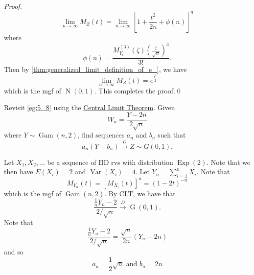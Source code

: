 \documentclass[notoc,notitlepage]{tufte-book}
\DeclareMathOperator{\Exp}{Exp }
\DeclareMathOperator{\Nor}{N }
\DeclareMathOperator{\Gau}{G }
\DeclareMathOperator{\Gam}{Gam }
\DeclareMathOperator{\Var}{Var }
\newcommand{\convd}{\overset{D}{\to}}
\begin{document}
\begin{proof}
  \begin{equation*}
    \lim_{n \to \infty} M_Z (t) = \lim_{n \to \infty} \left[ 1 + \frac{t^2}{2n} + \phi(n) \right]^n
  \end{equation*}
  where 
  \begin{equation*}
    \phi(n) = \frac{M_{Y_i}^{(3)} ( \zeta ) \left( \frac{t}{\sqrt{n}} \right)^3}{3!}.
  \end{equation*}
  Then by \cref{thm:generalized_limit_definition_of_e_}, we have
  \begin{equation*}
    \lim_{n \to \infty} M_Z(t) = e^{\frac{t^2}{2}}
  \end{equation*}
  which is the mgf of $\Nor(0, 1)$. This completes the proof.\qed
\end{proof}

\begin{eg}[Example 5.9]
  Revisit \cref{eg:5_8} using the \hyperref[thm:central_limit_theorem]{\faCoffee \; Central Limit Theorem}. Given
  \begin{equation*}
    W_n = \frac{Y - 2n}{2 \sqrt{n}}
  \end{equation*}
  where $Y \sim \Gam( n, 2 )$, find sequences $a_n$ and $b_n$ such that
  \begin{equation*}
    a_n ( Y - b_n ) \convd Z \sim G(0, 1).
  \end{equation*}
\end{eg}

\begin{solution}
   Let $X_1, X_2, ...$ be a sequence of IID rvs with distribution $\Exp(2)$. Note that we then have $E(X_i) = 2$ and $\Var(X_i) = 4$. Let $Y_n = \sum_{i=1}^{n} X_i$. Note that
  \begin{equation*}
    M_{Y_n}(t) = [ M_{X_i}(t) ]^n = (1 - 2t)^{-n}
  \end{equation*}
  which is the mgf of $\Gam(n, 2)$. By CLT, we have that
  \begin{equation*}
    \frac{\frac{1}{n} Y_n - 2}{2 / \sqrt{n}} \convd \Gau(0, 1).
  \end{equation*}
  Note that
  \begin{equation*}
    \frac{\frac{1}{n}Y_n - 2}{2 / \sqrt{n}} = \frac{\sqrt{n}}{2 n} ( Y_n - 2n )
  \end{equation*}
  and so
  \begin{equation*}
    a_n = \frac{1}{2}\sqrt{n} \text{ and } b_n = 2n
  \end{equation*}
\end{solution}
\end{document}
